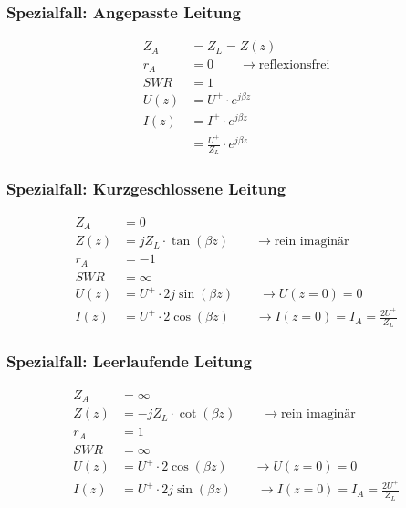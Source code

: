 \subsubsection{Spezialfall: Angepasste Leitung}
\begin{align*}
    Z_A  & = Z_L = Z(z)                              \\
    r_A  & = 0\qquad\rightarrow\text{reflexionsfrei} \\
    SWR  & = 1                                       \\
    U(z) & = U^+\cdot e ^{j\beta z}                  \\
    I(z) & = I^+ \cdot e^{j\beta z}                  \\
         & = \frac{U^+}{Z_L}\cdot e^{j\beta z}
\end{align*}

\subsubsection{Spezialfall: Kurzgeschlossene Leitung}
\begin{align*}
    Z_A  & = 0                                                                        \\
    Z(z) & = j Z_L\cdot\tan(\beta z)        \qquad\rightarrow\text{rein imaginär}     \\
    r_A  & = -1                                                                       \\
    SWR  & = \infty                                                                   \\
    U(z) & = U^+\cdot 2j\sin(\beta z)    \qquad\rightarrow U(z=0)=0                   \\
    I(z) & = U^+\cdot 2\cos(\beta z)    \qquad\rightarrow I(z=0)=I_A=\frac{2U^+}{Z_L}
\end{align*}

\subsubsection{Spezialfall: Leerlaufende Leitung}
\begin{align*}
    Z_A  & = \infty                                                                   \\
    Z(z) & = -jZ_L\cdot \cot(\beta z) \qquad\rightarrow\text{rein imaginär}           \\
    r_A  & = 1                                                                        \\
    SWR  & = \infty                                                                   \\
    U(z) & = U^+\cdot 2\cos(\beta z) \qquad\rightarrow U(z=0)=0                       \\
    I(z) & = U^+\cdot 2j\sin(\beta z) \qquad\rightarrow I(z=0)=I_A = \frac{2U^+}{Z_L}
\end{align*}

